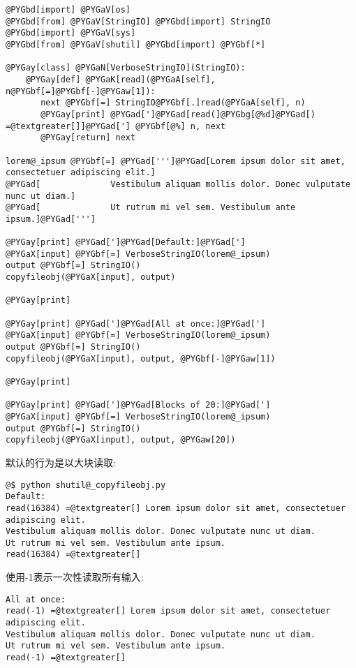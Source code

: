 \documentclass[letterpaper,10pt,english]{manual}
\begin{document}
\begin{Verbatim}[commandchars=@\[\]]
@PYGbd[import] @PYGaV[os]
@PYGbd[from] @PYGaV[StringIO] @PYGbd[import] StringIO
@PYGbd[import] @PYGaV[sys]
@PYGbd[from] @PYGaV[shutil] @PYGbd[import] @PYGbf[*]

@PYGay[class] @PYGaN[VerboseStringIO](StringIO):
    @PYGay[def] @PYGaK[read](@PYGaA[self], n@PYGbf[=]@PYGbf[-]@PYGaw[1]):
       next @PYGbf[=] StringIO@PYGbf[.]read(@PYGaA[self], n)
       @PYGay[print] @PYGad[']@PYGad[read(]@PYGbg[@%d]@PYGad[) =@textgreater[]]@PYGad['] @PYGbf[@%] n, next
       @PYGay[return] next

lorem@_ipsum @PYGbf[=] @PYGad[''']@PYGad[Lorem ipsum dolor sit amet, consectetuer adipiscing elit.]
@PYGad[              Vestibulum aliquam mollis dolor. Donec vulputate nunc ut diam.]
@PYGad[              Ut rutrum mi vel sem. Vestibulum ante ipsum.]@PYGad[''']

@PYGay[print] @PYGad[']@PYGad[Default:]@PYGad[']
@PYGaX[input] @PYGbf[=] VerboseStringIO(lorem@_ipsum)
output @PYGbf[=] StringIO()
copyfileobj(@PYGaX[input], output)

@PYGay[print]

@PYGay[print] @PYGad[']@PYGad[All at once:]@PYGad[']
@PYGaX[input] @PYGbf[=] VerboseStringIO(lorem@_ipsum)
output @PYGbf[=] StringIO()
copyfileobj(@PYGaX[input], output, @PYGbf[-]@PYGaw[1])

@PYGay[print]

@PYGay[print] @PYGad[']@PYGad[Blocks of 20:]@PYGad[']
@PYGaX[input] @PYGbf[=] VerboseStringIO(lorem@_ipsum)
output @PYGbf[=] StringIO()
copyfileobj(@PYGaX[input], output, @PYGaw[20])
\end{Verbatim}

默认的行为是以大块读取:

\begin{Verbatim}[commandchars=@\[\]]
@$ python shutil@_copyfileobj.py
Default:
read(16384) =@textgreater[] Lorem ipsum dolor sit amet, consectetuer adipiscing elit.
Vestibulum aliquam mollis dolor. Donec vulputate nunc ut diam.
Ut rutrum mi vel sem. Vestibulum ante ipsum.
read(16384) =@textgreater[]
\end{Verbatim}

使用-1表示一次性读取所有输入:

\begin{Verbatim}[commandchars=@\[\]]
All at once:
read(-1) =@textgreater[] Lorem ipsum dolor sit amet, consectetuer adipiscing elit.
Vestibulum aliquam mollis dolor. Donec vulputate nunc ut diam.
Ut rutrum mi vel sem. Vestibulum ante ipsum.
read(-1) =@textgreater[]
\end{Verbatim}
\end{document}
